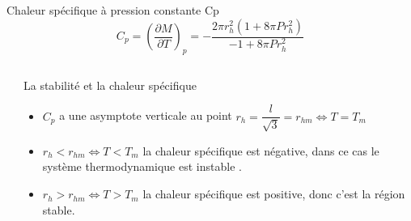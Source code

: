 \documentclass{beamer}
\begin{document}



\begin{frame}
\begin{block}{Chaleur spécifique à pression constante C{p}}
	$$C_{p}=\left( \dfrac{\partial M}{\partial T}\right) _{p}=-\dfrac{2\pi r_{h}^{2}(1+8\pi Pr_{h}^{2})}{-1+8\pi Pr_{h}^{2}}$$
\end{block}

\begin{columns}
	\begin{column}{5cm}
	\end{column}
	\begin{column}{7cm}
		
		\begin{block}{La stabilité et la chaleur spécifique}
			\begin{itemize}
				\item $C_{p}$ a une asymptote verticale au point $r_{h} = \dfrac{l}{\sqrt{3}} =r_{hm} \Leftrightarrow T=T_{m}$
				\item $r_{h} < r_{hm} \Leftrightarrow  T < T_{m} $ la chaleur spécifique est négative, dans ce cas le système thermodynamique est instable .
				\item $r_{h} > r_{hm} \Leftrightarrow  T > T_{m} $ la chaleur spécifique est positive, donc c’est la région stable.
				
			\end{itemize}
		\end{block}
	\end{column}
\end{columns}
\end{frame}
\end{document}
